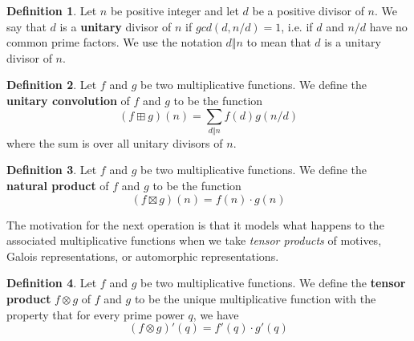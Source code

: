 \documentclass[a4paper]{article}
\theoremstyle{definition}
\newtheorem{definition}{Definition}[section]
\theoremstyle{remark}
\newcommand{\defhl}[1]{\textbf{#1}}
\begin{document}
\begin{definition}
Let $n$ be positive integer and let $d$ be a positive divisor of $n$. We say that $d$ is a \defhl{unitary} divisor of $n$ if $gcd(d, n/d) = 1$, i.e. if $d$ and $n/d$ have no common prime factors. We use the notation $d \Vert n$ to mean that $d$ is a unitary divisor of $n$. 
\end{definition}

\begin{definition}
Let $f$ and $g$ be two multiplicative functions. We define the \defhl{unitary convolution} of $f$ and $g$ to be the function
$$ (f \boxplus g)(n) =  \sum_{d \Vert n} f(d) g(n/d)  $$
where the sum is over all unitary divisors of $n$. 
\end{definition}

\begin{definition}
Let $f$ and $g$ be two multiplicative functions. We define the \defhl{natural product} of $f$ and $g$ to be the function
$$ (f \boxtimes g)(n) = f(n) \cdot g(n)   $$
\end{definition}
The motivation for the next operation is that it models what happens to the associated multiplicative functions when we take \emph{tensor products} of motives, Galois representations, or automorphic representations.

\begin{definition}
Let $f$ and $g$ be two multiplicative functions. We define the \defhl{tensor product} $f \otimes g$ of $f$ and $g$ to be the unique multiplicative function with the property that for every prime power $q$, we have
$$ (f \otimes g)'(q) = f'(q) \cdot g'(q)    $$
\end{definition}
\end{document}
